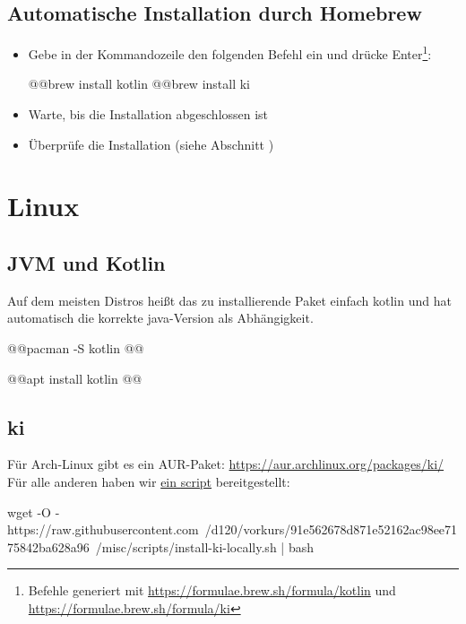 \subsection*{Automatische Installation durch Homebrew}
\begin{itemize}
    \item Gebe in der Kommandozeile den folgenden Befehl ein und drücke Enter\footnote{Befehle generiert mit \url{https://formulae.brew.sh/formula/kotlin} und \url{https://formulae.brew.sh/formula/ki}}:
\begin{commandshell}
@\shellprefix{}@brew install kotlin
@\shellprefix{}@brew install ki
\end{commandshell}
    \item Warte, bis die Installation abgeschlossen ist
    \item Überprüfe die Installation (siehe Abschnitt )
\end{itemize}

\section*{Linux}
\subsection*{JVM und Kotlin}
Auf dem meisten Distros heißt das zu installierende Paket einfach {\ttfamily kotlin} und hat automatisch die korrekte java-Version als Abhängigkeit.
\begin{commandshell}[][minted language=text]
    @\shellprefix{}@pacman -S kotlin @@
\end{commandshell}

\begin{commandshell}[][minted language=text]
    @\shellprefix{}@apt install kotlin @@
\end{commandshell}

\subsection*{ki}
Für Arch-Linux gibt es ein AUR-Paket: \url{https://aur.archlinux.org/packages/ki/}
Für alle anderen haben wir \href{https://raw.githubusercontent.com/d120/vorkurs/91e562678d871e52162ac98ee7175842ba628a96/misc/scripts/install-ki-locally.sh}{ein script} bereitgestellt:
\begin{commandshell}
    wget -O - https://raw.githubusercontent.com\
    /d120/vorkurs/91e562678d871e52162ac98ee7175842ba628a96\
    /misc/scripts/install-ki-locally.sh | bash
\end{commandshell}

